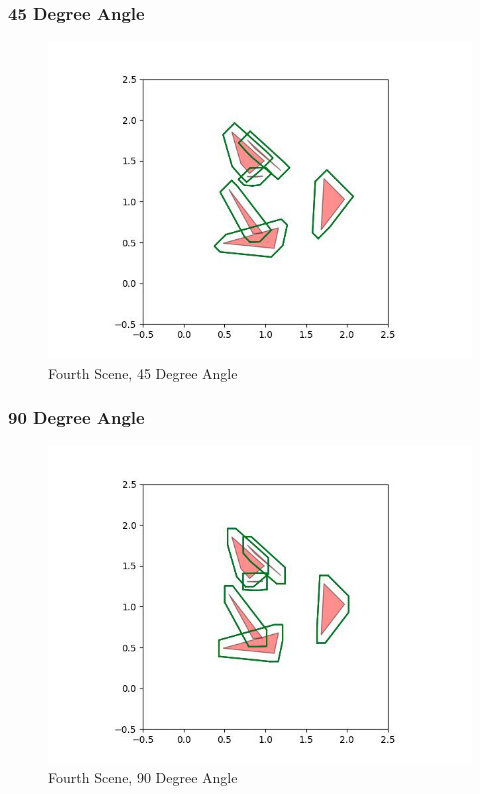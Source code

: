 \documentclass{article}
\begin{document}
\newpage
\subsubsection{45 Degree Angle}
\begin{figure}[h!]
	\includegraphics[width= 0.9 \linewidth]{Problem3_minkowski4_45.jpg}
	\centering
	\caption{Fourth Scene, 45 Degree Angle}
	\label{Problem3_minkowski4_45.jpg}
\end{figure}

\newpage
\subsubsection{90 Degree Angle}
\begin{figure}[h!]
	\includegraphics[width= 0.9 \linewidth]{Problem3_minkowski4_90.jpg}
	\centering
	\caption{Fourth Scene, 90 Degree Angle}
	\label{Problem3_minkowski4_90.jpg}
\end{figure}
\end{document}

